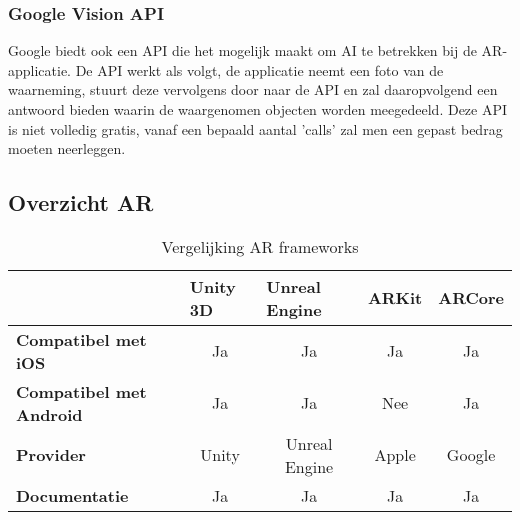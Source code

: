 \subsubsection{Google Vision API}
Google biedt ook een API die het mogelijk maakt om AI te betrekken bij de AR-applicatie. De API werkt als volgt, de applicatie neemt een foto van de waarneming, stuurt deze vervolgens door naar de API en zal daaropvolgend een antwoord bieden waarin de waargenomen objecten worden meegedeeld. Deze API is niet volledig gratis, vanaf een bepaald aantal 'calls' zal men een gepast bedrag moeten neerleggen.

\subsection{Overzicht AR}
\begin{table}[H]
	\centering
	\begin{tabular}{|l|c|c|c|c|}
		\hline
		& \multicolumn{1}{l|}{Unity 3D} & \multicolumn{1}{l|}{Unreal Engine} & \multicolumn{1}{l|}{ARKit} & \multicolumn{1}{l|}{ARCore} \\ \hline
		\textbf{Compatibel met iOS}     & Ja                            & Ja                                 & Ja                         & Ja                          \\ \hline
		\textbf{Compatibel met Android} & Ja                            & Ja                                 & Nee                        & Ja                          \\ \hline
		\textbf{Provider}               & Unity                         & Unreal Engine                      & Apple                      & Google                      \\ \hline
		\textbf{Documentatie}           & Ja                            & Ja                                 & Ja                         & Ja                          \\ \hline
	\end{tabular}
	\caption{Vergelijking AR frameworks}
\end{table}

